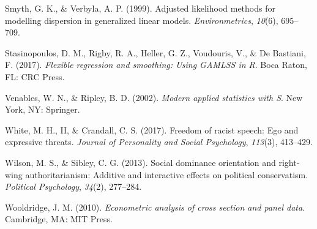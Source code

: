 \documentclass[english,man]{apa6}
\newcounter{author}
\theoremstyle{definition}
\theoremstyle{definition}
\theoremstyle{remark}
\begin{document}
\hypertarget{ref-smyth1999adjusted}{}
Smyth, G. K., \& Verbyla, A. P. (1999). Adjusted likelihood methods for
modelling dispersion in generalized linear models.
\emph{Environmetrics}, \emph{10}(6), 695--709.

\hypertarget{ref-stasinopoulos2017flexible}{}
Stasinopoulos, D. M., Rigby, R. A., Heller, G. Z., Voudouris, V., \& De
Bastiani, F. (2017). \emph{Flexible regression and smoothing: Using
GAMLSS in R}. Boca Raton, FL: CRC Press.

\hypertarget{ref-venables2002modern}{}
Venables, W. N., \& Ripley, B. D. (2002). \emph{Modern applied
statistics with S}. New York, NY: Springer.

\hypertarget{ref-white2017freedom}{}
White, M. H., II, \& Crandall, C. S. (2017). Freedom of racist speech:
Ego and expressive threats. \emph{Journal of Personality and Social
Psychology}, \emph{113}(3), 413--429.

\hypertarget{ref-wilson2013social}{}
Wilson, M. S., \& Sibley, C. G. (2013). Social dominance orientation and
right-wing authoritarianism: Additive and interactive effects on
political conservatism. \emph{Political Psychology}, \emph{34}(2),
277--284.

\hypertarget{ref-wooldridge2010econometric}{}
Wooldridge, J. M. (2010). \emph{Econometric analysis of cross section
and panel data}. Cambridge, MA: MIT Press.
\end{document}
